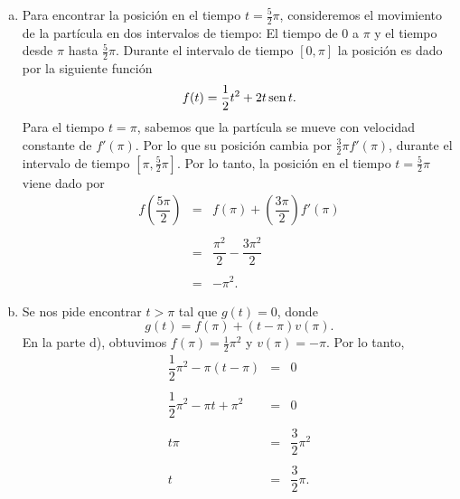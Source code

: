 \begin{enumerate}[\bfseries 1.]
\begin{enumerate}[a)]
	    \item Para encontrar la posición en el tiempo $t=\frac{5}{2}\pi$, consideremos el movimiento de la partícula en dos intervalos de tiempo: El tiempo de $0$ a $\pi$ y el tiempo desde $\pi$ hasta $\frac{5}{2}\pi$. Durante el intervalo de tiempo $[0,\pi]$ la posición es dado por la siguiente función 
		$$f(t)=\dfrac{1}{2}t^2+2t\mathop{\mbox{\normalfont sen}}\nolimits t.$$
		Para el tiempo $t=\pi$, sabemos que la partícula se mueve con velocidad constante de $f'(\pi)$. Por lo que su posición cambia por $\frac{3}{2}\pi f'(\pi)$, durante el intervalo de tiempo $[\pi,\frac{5}{2}\pi]$. Por lo tanto, la posición en el tiempo $t=\frac{5}{2}\pi$ viene dado por 
		$$\begin{array}{rcl}
		    f\left(\dfrac{5\pi}{2}\right) &=& f(\pi) + \left(\dfrac{3\pi}{2}\right) f'(\pi)\\\\
						  &=&\dfrac{\pi^2}{2}-\dfrac{3\pi^2}{2}\\\\
						  &=& -\pi^2.
		\end{array}$$
		\vspace{.5cm}

	    \item Se nos pide encontrar $t>\pi$ tal que $g(t)=0$, donde 
		$$g(t)=f(\pi)+(t-\pi)v(\pi).$$
		En la parte d), obtuvimos $f(\pi)=\frac{1}{2}\pi^2$ y $v(\pi)=-\pi$. Por lo tanto, 
		$$\begin{array}{rcl}
		    \dfrac{1}{2}\pi^2-\pi(t-\pi)&=&0\\\\
		    \dfrac{1}{2}\pi^2-\pi t + \pi^2&=&0\\\\
		    t\pi &=&\dfrac{3}{2}\pi^2\\\\
		    t&=&\dfrac{3}{2}\pi.
		\end{array}$$
		\vspace{.5cm}
	\end{enumerate}


\end{enumerate}
